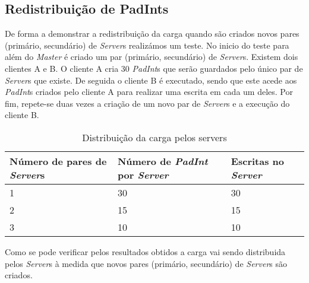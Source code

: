 \subsection{Redistribuição de PadInts}

De forma a demonstrar a redistribuição da carga quando são criados novos pares (primário, secundário) de \textit{Server}s realizámos um teste. No inicio do teste para além do \textit{Master} é criado um par (primário, secundário) de \textit{Server}s. Existem dois clientes A e B. O cliente A cria 30 \textit{PadInt}s que serão guardados pelo único par de \textit{Server}s que existe. De seguida o cliente B é executado, sendo que este acede aos \textit{PadInt}s criados pelo cliente A para realizar uma escrita em cada um deles. Por fim, repete-se duas vezes a criação de um novo par de \textit{Server}s e a execução do cliente B.
\begin{table}[H]
\centering
\begin{tabular}{| p{2.2cm} | p{2.2cm} | p{2.2cm} |}
\hline
\textbf{Número de pares de \textit{Server}s} &\textbf{Número de \textit{PadInt} por \textit{Server}} & \textbf{Escritas no \textit{Server}} \\
\hline
1 & 30 & 30  \\
\hline
2 & 15 & 15  \\
\hline
3 & 10 & 10 \\
\hline
\end{tabular}
\caption{Distribuição da carga pelos servers} \label{lib}
\end{table}

Como se pode verificar pelos resultados obtidos a carga vai sendo distribuida pelos \textit{Server}s à medida que novos pares (primário, secundário) de \textit{Server}s são criados.